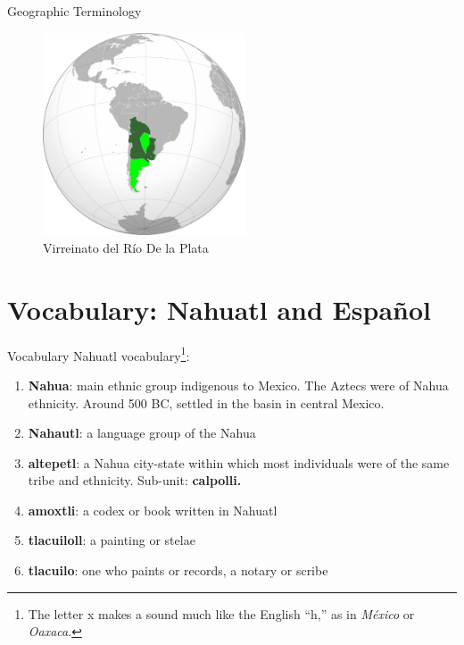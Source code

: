 \documentclass{beamer}
\begin{document}
\begin{frame}{Geographic Terminology}
\begin{figure}
\includegraphics[width=6cm]{figures/vice_riodelaplata.png}
\caption{Virreinato del R\'{i}o De la Plata}
\end{figure}
\end{frame}

\section{Vocabulary: Nahuatl and Espa\~{n}ol}

\begin{frame}{Vocabulary}
\small
Nahuatl vocabulary\footnote{The letter x makes a sound much like the English ``h,'' as in \textit{M\'{e}xico} or \textit{Oaxaca}.}:
\begin{enumerate}
\item \textbf{Nahua}: main ethnic group indigenous to Mexico.  The Aztecs were of Nahua ethnicity.  Around 500 BC, settled in the basin in central Mexico.
\item \textbf{Nahautl}: a language group of the Nahua
\item \textbf{altepetl}: a Nahua city-state within which most individuals were of the same tribe and ethnicity.  Sub-unit: \textbf{calpolli.}
\item \textbf{amoxtli}: a codex or book written in Nahuatl
\item \textbf{tlacuiloll}: a painting or stelae
\item \textbf{tlacuilo}: one who paints or records, a notary or scribe
\end{enumerate}
\end{frame}
\end{document}
